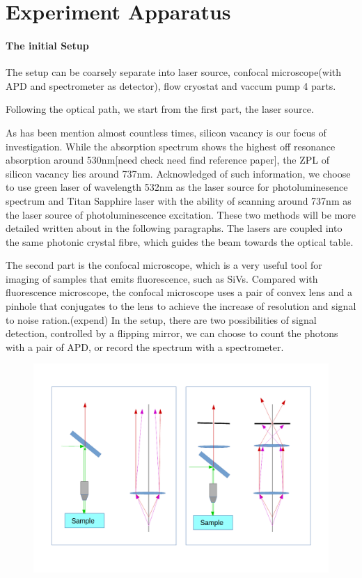 \section[experiment apparatus]{Experiment Apparatus}

\paragraph{The initial Setup} 

The setup can be coarsely separate into laser source, confocal microscope(with APD and spectrometer as detector), flow cryostat and vaccum pump 4 parts.

Following the optical path, we start from the first part, the laser source.

As has been mention almost countless times, silicon vacancy is our focus of investigation. While the absorption spectrum shows the highest off resonance absorption around 530nm[need check need find reference paper], the ZPL of silicon vacancy lies around 737nm. Acknowledged of such information, we choose to use green laser of wavelength 532nm as the laser source for photoluminesence spectrum and Titan Sapphire laser with the ability of scanning around 737nm as the laser source of photoluminescence excitation. These two methods will be more detailed written about in the following paragraphs.
The lasers are coupled into the same photonic crystal fibre, which guides the beam towards the optical table.

The second part is the confocal microscope, which is a very useful tool for imaging of samples that emits fluorescence, such as SiVs. Compared with fluorescence microscope, the confocal microscope uses a pair of convex lens and a pinhole that conjugates to the lens to achieve the increase of resolution and signal to noise ration.(expend)
In the setup, there are two possibilities of signal detection, controlled by a flipping mirror, we can choose to count the photons with a pair of APD, or record the spectrum with a spectrometer.
\begin{figure}[h]
\centering
\includegraphics[width=0.7\linewidth]{Figures/pic/microscope}
\caption{}
\label{fig:microscope}
\end{figure}

